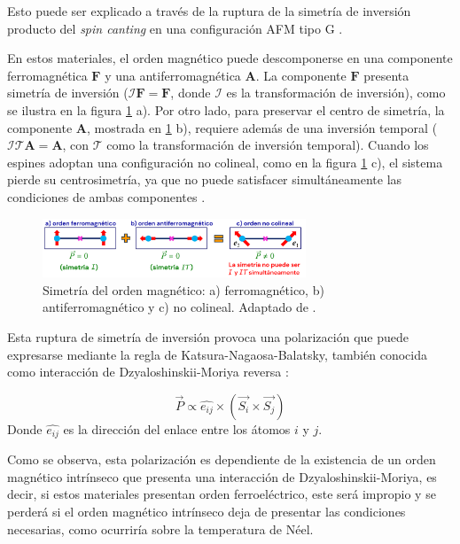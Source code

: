 \documentclass[../main.tex]{subfiles}
\begin{document}
Esto puede ser explicado a través de la ruptura de la simetría de inversión producto del \textit{spin canting} en una configuración AFM tipo G \cite{Lee2011}.

En estos materiales, el orden magnético puede descomponerse en una componente ferromagnética $\pmb{F}$ y una antiferromagnética $\pmb{A}$. La componente $\pmb{F}$ presenta simetría de inversión ($\mathcal{I}\pmb{F}=\pmb{F}$, donde $\mathcal{I}$ es la transformación de inversión), como se ilustra en la figura \ref{fig:spincantingferroelec} a). Por otro lado, para preservar el centro de simetría, la componente $\pmb{A}$, mostrada en \ref{fig:spincantingferroelec} b), requiere además de una inversión temporal ($\mathcal{I}\mathcal{T}\pmb{A}=\pmb{A}$, con $\mathcal{T}$ como la transformación de inversión temporal). Cuando los espines adoptan una configuración no colineal, como en la figura \ref{fig:spincantingferroelec} c), el sistema pierde su centrosimetría, ya que no puede satisfacer simultáneamente las condiciones de ambas componentes \cite{Solovyev2025}.

\begin{figure}[H]
    \centering
    \includegraphics[width=0.7\textwidth]{fig/spincantingferroelec.png}
    \caption{Simetría del orden magnético: a) ferromagnético, b) antiferromagnético y c) no colineal. Adaptado de \cite{Solovyev2025}.}
    \label{fig:spincantingferroelec}
\end{figure}

Esta ruptura de simetría de inversión provoca una polarización que puede expresarse mediante la regla de Katsura-Nagaosa-Balatsky, también conocida como interacción de Dzyaloshinskii-Moriya reversa \cite{Katsura2005}:

\begin{equation}
    \vec{P}\propto\hat{e_{ij}}\times\left(\vec{S_i}\times\vec{S_j}\right)
    \label{eq:KNB}
\end{equation}
Donde $\hat{e_{ij}}$ es la dirección del enlace entre los átomos $i$ y $j$.

Como se observa, esta polarización es dependiente de la existencia de un orden magnético intrínseco que presenta una interacción de Dzyaloshinskii-Moriya, es decir, si estos materiales presentan orden ferroeléctrico, este será impropio y se perderá si el orden magnético intrínseco deja de presentar las condiciones necesarias, como ocurriría sobre la temperatura de Néel.
\end{document}
